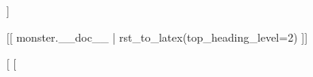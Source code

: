 {    \begin{description}
    [%
    \item [Senses:] [%
    \item [Languages:] [%
    [%
    [%
    [%
    [%
    [%
    \item [Challenge:] [[ monster.challenge_rating ]]
    \end{description}

    \vspace{0.2cm}
    
    [[ monster.__doc__ | rst_to_latex(top_heading_level=2) ]]

    } %
  [%
[%
